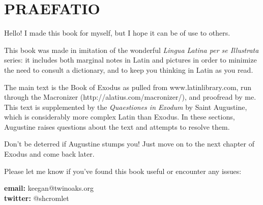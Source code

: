 \chapter{PRAEFATIO}

Hello! I made this book for myself, but I hope it can be of use to others.

This book was made in imitation of the wonderful {\it Lingua Latina per se
Illustrata} series: it includes both marginal notes in Latin and pictures in
order to minimize the need to consult a dictionary, and to keep you thinking in
Latin as you read.

The main text is the Book of Exodus as pulled from www.latinlibrary.com,
run through the Macronizer (http://alatius.com/macronizer/), and proof\-read
by me.  This text is supplemented by the {\it Quaestiones in Exodum} by
Saint Augustine, which is considerably more complex Latin than Exodus. In
these sections, Augustine raises questions about the text and attempts to  
resolve them. 

Don't be deterred if Augustine stumps you!
Just move on to the next chapter of Exodus and come back later.  

Please let me know if you've found this book useful or encounter any
issues:

\noindent
{\bf email:} keegan@twinoaks.org\\{\bf twitter:} @shcromlet
